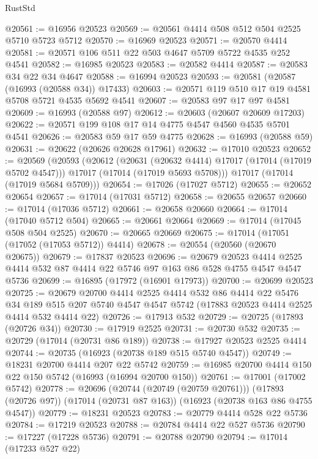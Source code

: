 \begin{lexlean}{RustStd}
\begin{coremodule}
{\begin{coremodule}
{{{{{{{{{{{{{{{{{{{{{{{{{{{{{{{{{{{{{{{{{{{{{{{{{{{{{{{@20561 := @16956 @20523
@20569 := @20561 @4414 @508 @512 @504 @2525 @5710 @5723 @5712
@20570 := @16969 @20523
@20571 := @20570 @4414
@20581 := @20571 @106 @511 @22 @503 @4647 @5709 @5722 @4535 @252 @4541
@20582 := @16985 @20523
@20583 := @20582 @4414
@20587 := @20583 @34 @22 @34 @4647
@20588 := @16994 @20523
@20593 := @20581 (@20587 (@16993 (@20588 @34)) @17433)
@20603 := @20571 @119 @510 @17 @19 @4581 @5708 @5721 @4535 @5692 @4541
@20607 := @20583 @97 @17 @97 @4581
@20609 := @16993 (@20588 @97)
@20612 := @20603 (@20607 @20609 @17203)
@20622 := @20571 @199 @108 @17 @14 @4775 @4547 @4560 @4535 @5701 @4541
@20626 := @20583 @59 @17 @59 @4775
@20628 := @16993 (@20588 @59)
@20631 := @20622 (@20626 @20628 @17961)
@20632 := @17010 @20523
@20652 := @20569
    (@20593
      (@20612
        (@20631 (@20632 @4414) @17017 (@17014 (@17019 @5702 @4547)))
        @17017
        (@17014 (@17019 @5693 @5708)))
      @17017
      (@17014 (@17019 @5684 @5709)))
@20654 := @17026 (@17027 @5712)
@20655 := @20652 @20654
@20657 := @17014 (@17031 @5712)
@20658 := @20655 @20657
@20660 := @17014 (@17036 @5712)
@20661 := @20658 @20660
@20664 := @17014 (@17040 @5712 @504)
@20665 := @20661 @20664
@20669 := @17014 (@17045 @508 @504 @2525)
@20670 := @20665 @20669
@20675 := @17014 (@17051 (@17052 (@17053 @5712)) @4414)
@20678 := @20554 (@20560 (@20670 @20675))
@20679 := @17837 @20523
@20696 := @20679
    @20523
    @4414
    @2525
    @4414
    @532
    @87
    @4414
    @22
    @5746
    @97
    @163
    @86
    @528
    @4755
    @4547
    @4547
    @5736
@20699 := @16895 (@17972 (@16901 @17973))
@20700 := @20699 @20523
@20725 := @20679
    @20700
    @4414
    @2525
    @4414
    @532
    @86
    @4414
    @22
    @5476
    @34
    @189
    @515
    @207
    @5740
    @4547
    @4547
    @5742
    (@17883 @20523 @4414 @2525 @4414 @532 @4414 @22)
@20726 := @17913 @532
@20729 := @20725 (@17893 (@20726 @34))
@20730 := @17919 @2525
@20731 := @20730 @532
@20735 := @20729 (@17014 (@20731 @86 @189))
@20738 := @17927 @20523 @2525 @4414
@20744 := @20735 (@16923 (@20738 @189 @515 @5740 @4547))
@20749 := @18231 @20700 @4414 @207 @22 @5742
@20759 := @16985 @20700 @4414 @150 @22 @150 @5742 (@16993 (@16994 @20700 @150))
@20761 := @17001 (@17002 @5742)
@20778 := @20696
    (@20744 (@20749 (@20759 @20761)))
    (@17893 (@20726 @97))
    (@17014 (@20731 @87 @163))
    (@16923 (@20738 @163 @86 @4755 @4547))
@20779 := @18231 @20523
@20783 := @20779 @4414 @528 @22 @5736
@20784 := @17219 @20523
@20788 := @20784 @4414 @22 @527 @5736
@20790 := @17227 (@17228 @5736)
@20791 := @20788 @20790
@20794 := @17014 (@17233 @527 @22)
}}}}}}}}}}}}}}}}}}}}}}}}}}}}}}}}}}}}}}}}}}}}}}}}}}}}}}}
\end{coremodule}}
\end{coremodule}
\end{lexlean}
